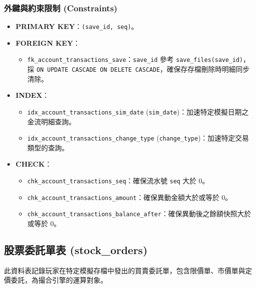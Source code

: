 \documentclass[UTF8, a4paper, 12pt, fontset=none]{ctexart}
\begin{document}
    \subsubsection*{外鍵與約束限制 (Constraints)}
    \begin{itemize}
        \item \textbf{PRIMARY KEY}：\texttt{(save\_id, seq)}。
        \item \textbf{FOREIGN KEY}：
            \begin{itemize}
                \item \texttt{fk\_account\_transactions\_save}：\texttt{save\_id} 參考 \texttt{save\_files(save\_id)}，\\採 \texttt{ON UPDATE CASCADE ON DELETE CASCADE}，確保存存檔刪除時明細同步清除。
            \end{itemize}
        \item \textbf{INDEX}：
            \begin{itemize}
                \item \texttt{idx\_account\_transactions\_sim\_date} (\texttt{sim\_date})：加速特定模擬日期之金流明細查詢。
                \item \texttt{idx\_account\_transactions\_change\_type} (\texttt{change\_type})：加速特定交易類型的查詢。
            \end{itemize}
        \item \textbf{CHECK}：
            \begin{itemize}
                \item \texttt{chk\_account\_transactions\_seq}：確保流水號 \texttt{seq} 大於 0。
                \item \texttt{chk\_account\_transactions\_amount}：確保異動金額大於或等於 0。
                \item \texttt{chk\_account\_transactions\_balance\_after}：確保異動後之餘額快照大於或等於 0。
            \end{itemize}
    \end{itemize}

    \subsection{股票委託單表 (stock\_orders)}
    

    此資料表記錄玩家在特定模擬存檔中發出的買賣委託單，包含限價單、市價單與定價委託，為撮合引擎的運算對象。
\end{document}
